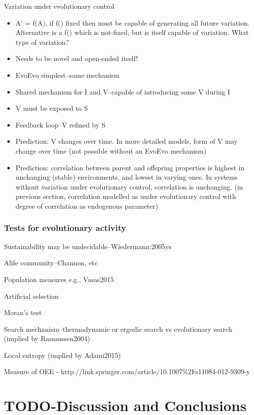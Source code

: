Variation under evolutionary control

\begin{itemize}
	\item
 A' = f(A), if f() fixed then must be capable of generating all future
 variation. Alternative is a f() which is not-fixed, but is itself
 capable of variation. What type of variation?
	\item
 Needs to be novel and open-ended itself!
	\item
 EvoEvo simplest--same mechanism
	\item
 Shared mechanism for I and V--capable of introducing some V during I
	\item
 V must be exposed to S
	\item
 Feedback loop--V refined by S
	\item
 Prediction: V changes over time. In more detailed models, form of V
 may change over time (not possible without an EvoEvo mechanism)
	\item
 Prediction: correlation between parent and offspring properties is highest
 in unchanging (stable) environments, and lowest in varying ones. In
 systems without variation under evolutionary control, correlation is
 unchanging. (in previous section, correlation modelled as under
 evolutionary control with degree of correlation as endogenous
 parameter)
\end{itemize}

\subsection{Tests for evolutionary activity}\label{tests-for-evolutionary-activity-1}

Sustainability may be undecidable--Wiedermann:2005ys

Alife community--Channon, etc

Population measures e.g., Vasas2015

Artificial selection

Moran's test

Search mechanism--thermodynamic or ergodic search vs evolutionary
search (implied by Rasmussen2004)

Local entropy (implied by Adami2015)

Measure of OEE -
http://link.springer.com/article/10.1007\%2Fs11084-012-9309-y

\chapter{TODO-Discussion and Conclusions}\label{discussion-and-conclusions}

